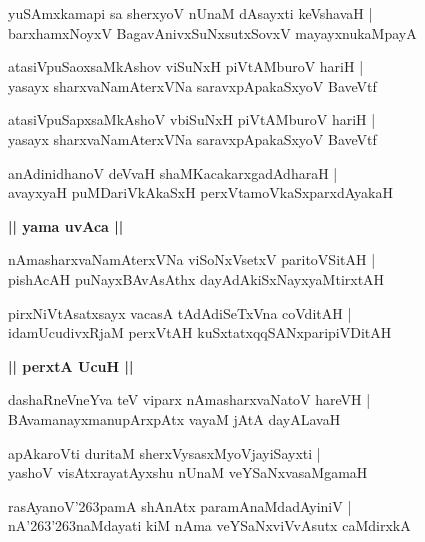 \documentclass[twoside,12pt,openright]{book}
\def\S{\char'263}
\newcounter{shloka}[chapter]
\def\uvaca#1{\centerline{{\large\textbf{#1}}}}
\begin{document}
\begin{shloka}%
yuSAmxkamapi sa sherxyoV nUnaM dAsayxti keVshavaH |\\
barxhamxNoyxV BagavAnivxSuNxsutxSovxV mayayxnukaMpayA 
\end{shloka}

\begin{shloka}%
atasiVpuSaoxsaMkAshov viSuNxH piVtAMburoV hariH |\\
yasayx sharxvaNamAterxVNa saravxpApakaSxyoV BaveVtf
\end{shloka}

\begin{shloka}%
atasiVpuSapxsaMkAshoV vbiSuNxH piVtAMburoV hariH |\\
yasayx sharxvaNamAterxVNa saravxpApakaSxyoV BaveVtf
\end{shloka}

\begin{shloka}%
anAdinidhanoV deVvaH shaMKacakarxgadAdharaH |\\
avayxyaH puMDariVkAkaSxH perxVtamoVkaSxparxdAyakaH 
\end{shloka}

\uvaca{|| yama uvAca ||}

\begin{shloka}%
nAmasharxvaNamAterxVNa viSoNxVsetxV paritoVSitAH |\\
pishAcAH puNayxBAvAsAthx dayAdAkiSxNayxyaMtirxtAH 
\end{shloka}

\begin{shloka}%
pirxNiVtAsatxsayx vacasA tAdAdiSeTxVna coVditAH |\\
idamUcudivxRjaM perxVtAH kuSxtatxqqSANxparipiVDitAH
\end{shloka}

\uvaca{|| perxtA UcuH ||}

\begin{shloka}%
dashaRneVneYva teV viparx nAmasharxvaNatoV hareVH |\\
BAvamanayxmanupArxpAtx vayaM jAtA dayALavaH 
\end{shloka}

\begin{shloka}%
apAkaroVti duritaM sherxVysasxMyoVjayiSayxti |\\
yashoV visAtxrayatAyxshu nUnaM veYSaNxvasaMgamaH 
\end{shloka}

\begin{shloka}%
rasAyanoV\S pamA shAnAtx paramAnaMdadAyiniV |\\
nA\S \S naMdayati kiM nAma veYSaNxviVvAsutx caMdirxkA 
\end{shloka}
\end{document}
